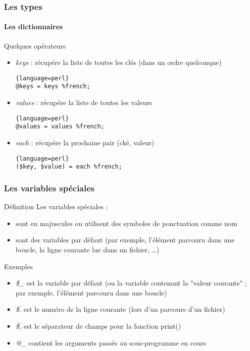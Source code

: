 \begin{frame}[fragile]
  \frametitle{Les types}
  \framesubtitle{Les dictionnaires}

  \begin{block}{Quelques opérateurs}
    \begin{itemize}
    \item \textit{keys} : récupére la liste de toutes les clés (dans un ordre
      quelconque)
      \begin{lstlisting}{language=perl}
@keys = keys %french;
      \end{lstlisting}
    \item \textit{values} : récupére la liste de toutes les valeurs
      \begin{lstlisting}{language=perl}
@values = values %french;
      \end{lstlisting}
    \item \textit{each} : récupére la prochaine pair (cké, valeur)
      \begin{lstlisting}{language=perl}
($key, $value) = each %french;
      \end{lstlisting}
    \end{itemize}
  \end{block}

\end{frame}

\begin{frame}[fragile]
  \frametitle{Les variables spéciales}

  \begin{block}{Définition}
    Les variables spéciales :
    \begin{itemize}
    \item sont en majuscules ou utilisent des symboles de ponctuation comme nom
    \item sont des variables par défaut (par exemple, l'élément parcouru dans
      une boucle, la ligne courante lue dans un fichier, \ldots)
    \end{itemize}
  \end{block}

  \begin{exampleblock}{Exemples}
    \begin{itemize}
    \item \textit{\$\_} est la variable par défaut (ou la variable contenant
      la "valeur courante" ; par exemple, l'élément parcouru dans une boucle)
    \item \textit{\$.} est le numéro de la ligne courante (lors d'un parcours
      d'un fichier)
    \item \textit{\$,} est le séparateur de champs pour la fonction print()
    \item \textit{@\_} contient les arguments passés au sous-programme en cours
    \end{itemize}
  \end{exampleblock}

\end{frame}


